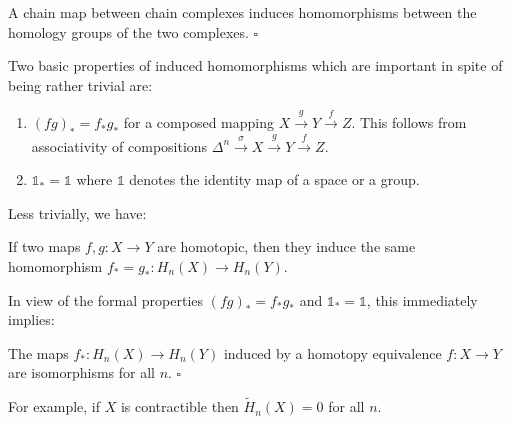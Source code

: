 \begin{proposition}
\label{prop:chain-map-induces-homology-homomorphism}
A chain map between chain complexes induces homomorphisms
between the homology groups of the two complexes. $\square$
\end{proposition}

Two basic properties of induced homomorphisms which are important in spite
of being rather trivial are:
\begin{enumerate}
\item[{\rm (i)}] $(fg)_* = f_*g_*$ for a composed mapping $X \xrightarrow{g} Y \xrightarrow{f} Z$. This follows from
associativity of compositions $\Delta^n \xrightarrow{\sigma} X \xrightarrow{g} Y \xrightarrow{f} Z$.
\item[{\rm (ii)}] $\mathbb{1}_* = \mathbb{1}$ where $\mathbb{1}$ denotes the identity map of a space or a group.
\end{enumerate}

Less trivially, we have:

\begin{theorem}
\label{thm:homotopic-maps-induce-same-homology-map}
If two maps $f,g:X \to Y$ are homotopic, then they induce the same
homomorphism $f_* = g_*:H_n(X) \to H_n(Y)$.
\end{theorem}

In view of the formal properties $(fg)_* = f_*g_*$ and $\mathbb{1}_* = \mathbb{1}$, this immediately
implies:

\begin{corollary}
\label{cor:homotopy-equivalence-induces-homology-isomorphism}
The maps $f_*:H_n(X)\to H_n(Y)$ induced by a homotopy equivalence
$f:X\to Y$ are isomorphisms for all $n$. $\square$
\end{corollary}

For example, if $X$ is contractible then $\tilde H_n(X) = 0$ for all $n$.

